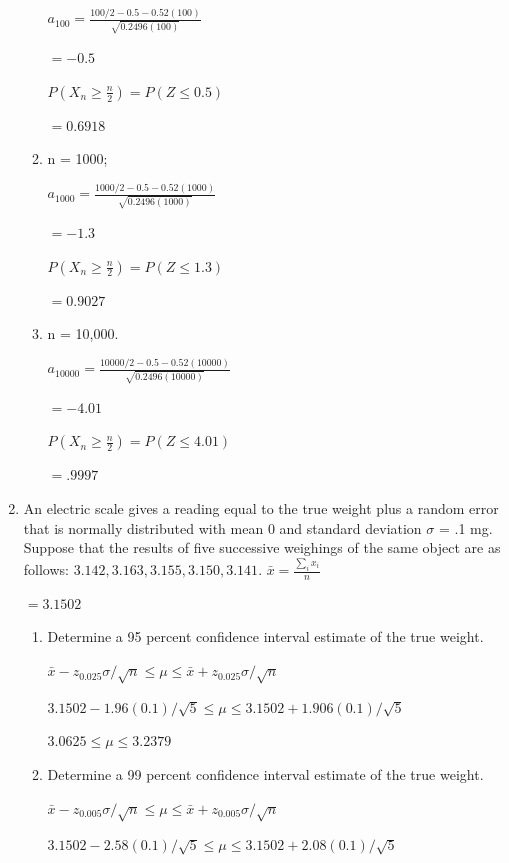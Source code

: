 \documentclass{article}
\begin{document}
\begin{enumerate}
\begin{enumerate}
        $a_{100} = \frac{100/2 - 0.5 -0.52(100)}{\sqrt{0.2496(100)}}$

        $= -0.5$

        $P\left(X_n \geq \frac{n}{2}\right) = P\left(Z \leq 0.5\right)$

        $= 0.6918$

        \item n = 1000;
        
        $a_{1000} = \frac{1000/2 - 0.5 -0.52(1000)}{\sqrt{0.2496(1000)}}$

        $= -1.3$

        $P\left(X_n \geq \frac{n}{2}\right) = P\left(Z \leq 1.3\right)$

        $= 0.9027$
        \item n = 10,000.
        
        $a_{10000} = \frac{10000/2 - 0.5 -0.52(10000)}{\sqrt{0.2496(10000)}}$

        $= -4.01$

        $P\left(X_n \geq \frac{n}{2}\right) = P\left(Z \leq 4.01\right)$

        $= .9997$
    \end{enumerate}

    \item An electric scale gives a reading equal to the true weight plus a random error that is normally distributed with mean 0 and standard deviation $\sigma$ = .1 mg. Suppose that the results of five successive weighings of the same object are as follows: $3.142, 3.163, 3.155, 3.150, 3.141$.
    $\displaystyle \bar{x} = \frac{\sum_{i}{x_i}}{n}$

    $= 3.1502$
    \begin{enumerate}
        \item Determine a 95 percent confidence interval estimate of the true weight.
        
        $\bar{x} - z_{0.025}\sigma/\sqrt{n} \leq \mu \leq \bar{x} + z_{0.025}\sigma/\sqrt{n}$

        $3.1502 - 1.96(0.1)/\sqrt{5} \leq \mu \leq 3.1502 + 1.906(0.1)/\sqrt{5}$

        $3.0625 \leq \mu \leq 3.2379$
        \item Determine a 99 percent confidence interval estimate of the true weight.
        
        $\bar{x} - z_{0.005}\sigma/\sqrt{n} \leq \mu \leq \bar{x} + z_{0.005}\sigma/\sqrt{n}$

        $3.1502 - 2.58(0.1)/\sqrt{5} \leq \mu \leq 3.1502 + 2.08(0.1)/\sqrt{5}$


\end{enumerate}
\end{enumerate}
\end{document}
